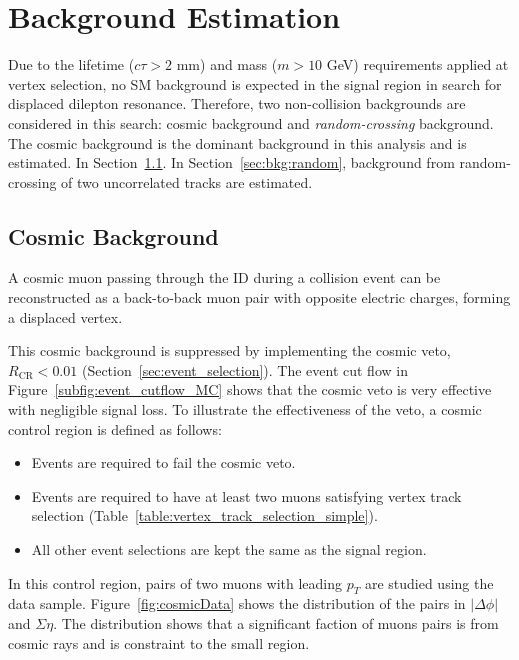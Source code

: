 \chapter{Background Estimation}
\label{chap:bkg}

Due to the lifetime ($c\tau > 2$ mm) and mass ($m > 10$ GeV) requirements applied at vertex selection, no SM background is expected in the signal region in search for displaced dilepton resonance. Therefore, two non-collision backgrounds are considered in this search: cosmic background and \textit{random-crossing} background. The cosmic background is the dominant background in this analysis and is estimated. In Section~\ref{sec:bkg:cosmic}. In Section~\ref{sec:bkg:random}, background from random-crossing of two uncorrelated tracks are estimated.


\section{Cosmic Background}
\label{sec:bkg:cosmic}

A cosmic muon passing through the ID during a collision event can be reconstructed as a back-to-back muon pair with opposite electric charges, forming a displaced \mumu vertex.

This cosmic background is suppressed by implementing the cosmic veto, $R_{\mathrm{CR}} < 0.01$ (Section~\ref{sec:event_selection}). The event cut flow in Figure~\ref{subfig:event_cutflow_MC} shows that the cosmic veto is very effective with negligible signal loss. To illustrate the effectiveness of the veto, a cosmic control region is defined as follows:

\begin{itemize}
  \item Events are required to fail the cosmic veto.
  \item Events are required to have at least two muons satisfying vertex track selection (Table~\ref{table:vertex_track_selection_simple}).
  \item All other event selections are kept the same as the signal region.
\end{itemize}

In this control region, pairs of two muons with leading $p_{T}$ are studied using the data sample. Figure~\ref{fig:cosmicData} shows the distribution of the pairs in $|\Delta\phi|$ and $\Sigma \eta$. The distribution shows that a significant faction of muons pairs is from cosmic rays and is constraint to the small \Rcr region.

